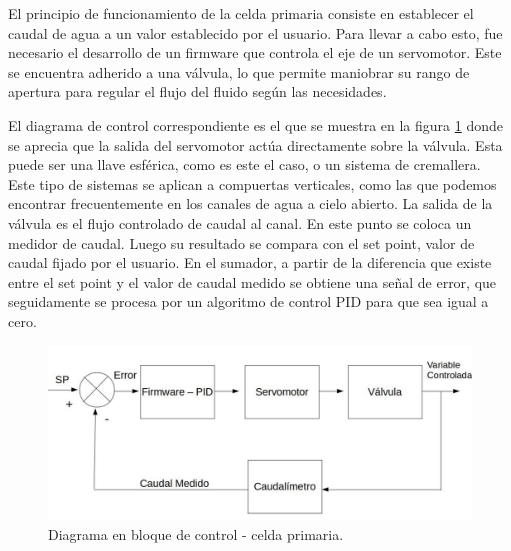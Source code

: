 El principio de funcionamiento de la celda primaria consiste en establecer el caudal de agua a un valor establecido por el usuario. Para llevar a cabo esto, fue necesario el desarrollo de un firmware que controla el eje de un servomotor. Este se encuentra adherido a una válvula, lo que permite maniobrar su rango de apertura para regular el flujo del fluido según las necesidades.

El diagrama de control correspondiente es el que se muestra en la figura \ref{fig:CeldaPrimaria} donde se aprecia que la salida del servomotor actúa directamente sobre la válvula. Esta puede ser una llave esférica, como es este el caso, o un sistema de cremallera. Este tipo de sistemas se aplican a compuertas verticales, como las que podemos encontrar frecuentemente en los canales de agua a cielo abierto. La salida de la válvula es el flujo controlado de caudal al canal. En este punto se coloca un medidor de caudal. Luego su resultado se compara con el set point, valor de caudal fijado por el usuario. En el sumador, a partir de la diferencia que existe entre el set point y el valor de caudal medido se obtiene una señal de error, que seguidamente se procesa por un algoritmo de control PID para que sea igual a cero.

\begin{figure}[htpb]
\centering
\includegraphics[scale=.45]{./Figures/DiagramaEnBloqueDeControlCeldaPrimaria-V5.png}
\caption{Diagrama en bloque de control - celda primaria.}
\label{fig:CeldaPrimaria}
\end{figure}

